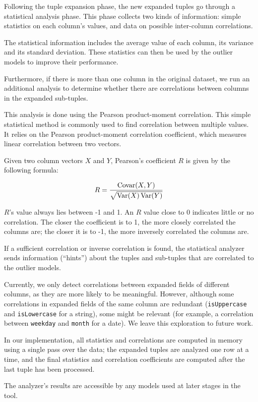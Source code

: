 Following the tuple expansion phase, the new expanded tuples go through a statistical analysis phase. This phase collects two kinds of information: simple statistics on each column's values, and data on possible inter-column correlations.

The statistical information includes the average value of each column, its variance and its standard deviation. These statistics can then be used by the outlier models to improve their performance.

Furthermore, if there is more than one column in the original dataset, we run an additional analysis to determine whether there are correlations between columns in the expanded sub-tuples.

This analysis is done using the Pearson product-moment correlation. This simple statistical method is commonly used to find correlation between multiple values. It relies on the Pearson product-moment correlation coefficient, which measures linear correlation between two vectors.

Given two column vectors $X$ and $Y$, Pearson's coefficient $R$ is given by the following formula:

$$
R = \frac{\operatorname{Covar}(X,Y)}{\sqrt{\operatorname{Var}(X)\operatorname{Var}(Y)}}
$$

$R$'s value always lies between -1 and 1. An $R$ value close to 0 indicates little or no correlation. The closer the coefficient is to 1, the more closely correlated the columns are; the closer it is to -1, the more inversely correlated the columns are.

If a sufficient correlation or inverse correlation is found, the statistical analyzer sends information (``hints'') about the tuples and sub-tuples that are correlated to the outlier models.

Currently, we only detect correlations between expanded fields of different columns, as they are more likely to be meaningful. However, although some correlations in expanded fields of the same column are redundant (\texttt{isUppercase} and \texttt{isLowercase} for a string), some might be relevant (for example, a correlation between \texttt{weekday} and \texttt{month} for a date). We leave this exploration to future work.

In our implementation, all statistics and correlations are computed in memory using a single pass over the data; the expanded tuples are analyzed one row at a time, and the final statistics and correlation coefficients are computed after the last tuple has been processed.

The analyzer's results are accessible by any models used at later stages in the tool.
